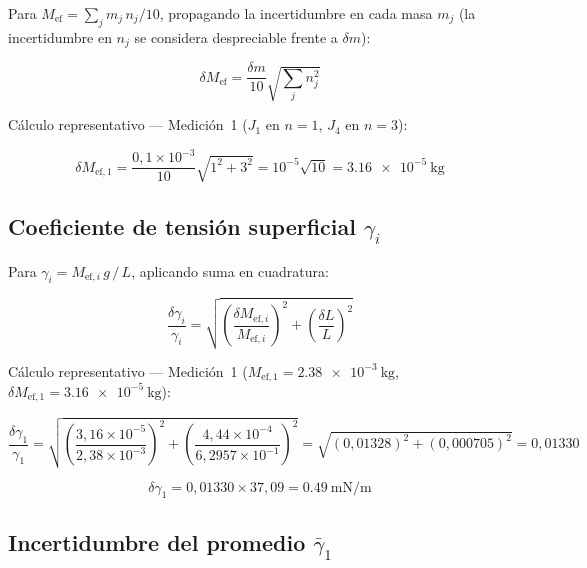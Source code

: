 \begin{appendices}
Para $M_{\text{ef}} = \sum_j m_j\,n_j/10$, propagando la incertidumbre
en cada masa $m_j$ (la incertidumbre en $n_j$ se considera despreciable
frente a $\delta m$):

\begin{equation}
    \delta M_{\text{ef}} = \frac{\delta m}{10}
    \sqrt{\sum_j n_j^2}
\end{equation}

Cálculo representativo — Medición~1
($J_1$ en $n=1$, $J_4$ en $n=3$):

\begin{equation*}
    \delta M_{\text{ef},1}
    = \frac{0{,}1\times10^{-3}}{10}\sqrt{1^2 + 3^2}
    = 10^{-5}\sqrt{10}
    = \qty{3,16e-5}{\kilogram}
\end{equation*}

\subsection{Coeficiente de tensión superficial \texorpdfstring{$\gamma_i$}{gamma\_i}}

Para $\gamma_i = M_{\text{ef},i}\,g\,/\,L$, aplicando suma en
cuadratura:

\begin{equation}
    \frac{\delta\gamma_i}{\gamma_i} =
    \sqrt{
        \left(\frac{\delta M_{\text{ef},i}}{M_{\text{ef},i}}\right)^2 +
        \left(\frac{\delta L}{L}\right)^2
    }
\end{equation}

Cálculo representativo — Medición~1
($M_{\text{ef},1} = \qty{2,38e-3}{\kilogram}$,
$\delta M_{\text{ef},1} = \qty{3,16e-5}{\kilogram}$):

\begin{equation*}
    \frac{\delta\gamma_1}{\gamma_1}
    = \sqrt{
        \left(\frac{3{,}16\times10^{-5}}{2{,}38\times10^{-3}}\right)^2 +
        \left(\frac{4{,}44\times10^{-4}}{6{,}2957\times10^{-1}}\right)^2
      }
    = \sqrt{(0{,}01328)^2 + (0{,}000705)^2}
    = 0{,}01330
\end{equation*}

\begin{equation*}
    \delta\gamma_1 = 0{,}01330 \times 37{,}09 = \qty{0,49}{\milli\newton\per\meter}
\end{equation*}

\subsection{Incertidumbre del promedio \texorpdfstring{$\bar{\gamma}_1$}{gamma promedio}}


\end{appendices}

